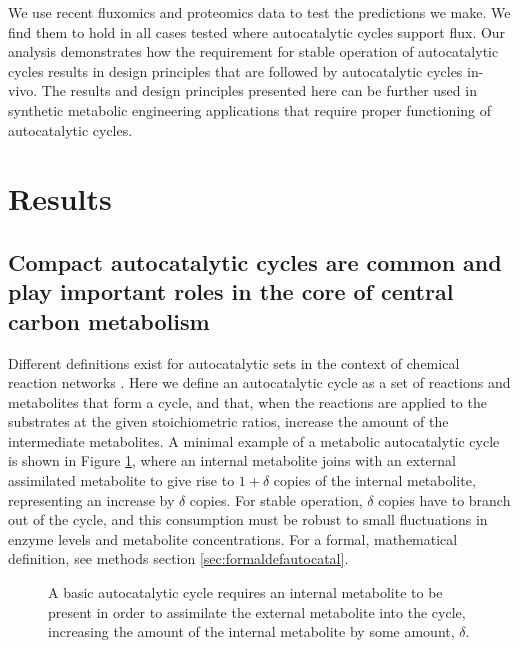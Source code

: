     We use recent fluxomics and proteomics data to test the predictions we make.
    We find them to hold in all cases tested where autocatalytic cycles support flux.
    Our analysis demonstrates how the requirement for stable operation of autocatalytic cycles results in design principles that are followed by autocatalytic cycles in-vivo.
    The results and design principles presented here can be further used in synthetic metabolic engineering applications that require proper functioning of autocatalytic cycles.

\section{Results}
\subsection{Compact autocatalytic cycles are common and play important roles in the core of central carbon metabolism}
Different definitions exist for autocatalytic sets in the context of chemical reaction networks \cite{Hordijk2004-xe, Eigen2012-ti, Kun2008-xg}.
Here we define an autocatalytic cycle as a set of reactions and metabolites that form a cycle, and that, when the reactions are applied to the substrates at the given stoichiometric ratios, increase the amount of the intermediate metabolites.
A minimal example of a metabolic autocatalytic cycle is shown in Figure \ref{fig:autocataldef}, where an internal metabolite joins with an external assimilated metabolite to give rise to $1+\delta$ copies of the internal metabolite, representing an increase by $\delta$ copies.
For stable operation, $\delta$ copies have to branch out of the cycle, and this consumption must be robust to small fluctuations in enzyme levels and metabolite concentrations.
For a formal, mathematical definition, see methods section \ref{sec:formaldefautocatal}.

\begin{figure}[!htb]
\iftoggle{elifesubmission} { }
{
    \centering{
        }
}
\caption{
    \label{fig:autocataldef}
  A basic autocatalytic cycle requires an internal metabolite to be present in order to assimilate the external metabolite into the cycle, increasing the amount of the internal metabolite by some amount, $\delta$.}
\end{figure}


